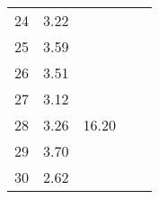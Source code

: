 \begin{center}
\begin{tabular}{| l || c | c | c | c |}
24 & \multirow{1}{*}{ 3.22 }  & & & \\\cline{2-2}
25 & \multirow{1}{*}{ 3.59 }  & & & \\\cline{2-2}\cline{3-3}
26 & \multirow{1}{*}{ 3.51 }  & \multirow{5}{*}{ 16.20 }  & & \\\cline{2-2}
27 & \multirow{1}{*}{ 3.12 }  & & & \\\cline{2-2}
28 & \multirow{1}{*}{ 3.26 }  & & & \\\cline{2-2}
29 & \multirow{1}{*}{ 3.70 }  & & & \\\cline{2-2}
30 & \multirow{1}{*}{ 2.62 }  & & & \\\cline{2-2}\cline{3-3}\cline{4-4}\cline{5-5}
\hline\end{tabular}
\end{center}